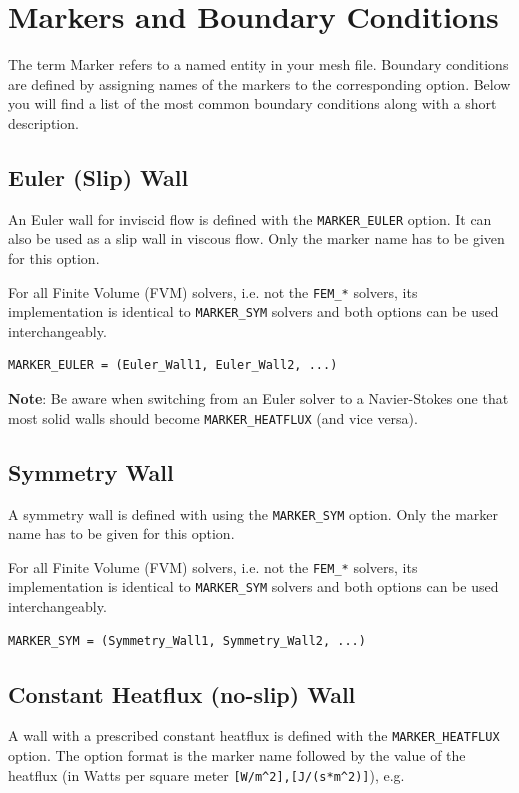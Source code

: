 \documentclass[12pt, a4paper, twoside]{article}
\begin{document}
\newpage
\section{Markers and Boundary Conditions}

The term Marker refers to a named entity in your mesh file. Boundary conditions are defined by assigning names of the markers to the corresponding option. Below you will find a list of the most common boundary conditions along with a short description.

\subsection{Euler (Slip) Wall}
An Euler wall for inviscid flow is defined with the \verb|MARKER_EULER| option. It can also be used as a slip wall in viscous flow. Only the marker name has to be given for this option.

For all Finite Volume (FVM) solvers, i.e. not the \verb|FEM_*| solvers, its implementation is identical to \verb|MARKER_SYM| solvers and both options can be used interchangeably.

\begin{lstlisting}
MARKER_EULER = (Euler_Wall1, Euler_Wall2, ...)
\end{lstlisting}

\textbf{Note}: Be aware when switching from an Euler solver to a Navier-Stokes one that most solid walls should become \verb|MARKER_HEATFLUX| (and vice versa).

\subsection{Symmetry Wall}
A symmetry wall is defined with using the \verb|MARKER_SYM| option. Only the marker name has to be given for this option.

For all Finite Volume (FVM) solvers, i.e. not the \verb|FEM_*| solvers, its implementation is identical to \verb|MARKER_SYM| solvers and both options can be used interchangeably.

\begin{lstlisting}
MARKER_SYM = (Symmetry_Wall1, Symmetry_Wall2, ...)

\end{lstlisting}


\subsection{Constant Heatflux (no-slip) Wall}
A wall with a prescribed constant heatflux is defined with the \verb|MARKER_HEATFLUX| option. The option format is the marker name followed by the value of the heatflux (in Watts per square meter \verb|[W/m^2],[J/(s*m^2)]|), e.g.
\end{document}
